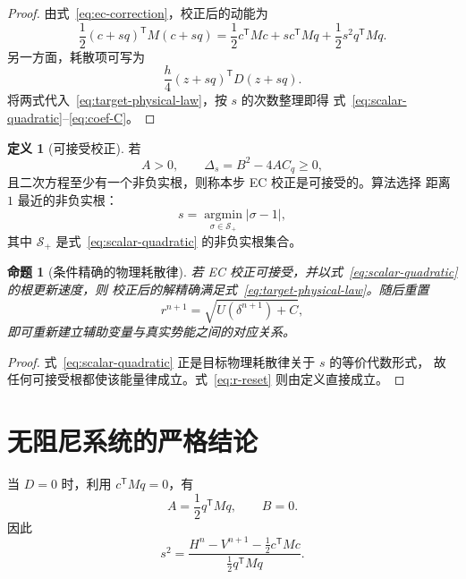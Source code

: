 \documentclass[UTF8,11pt,a4paper]{ctexart}
\newtheorem{proposition}[theorem]{命题}
\theoremstyle{definition}
\newtheorem{definition}[theorem]{定义}
\theoremstyle{remark}
\newcommand{\trans}{\mathsf{T}}
\begin{document}
\begin{proof}
由式~\eqref{eq:ec-correction}，校正后的动能为
\begin{equation}
  \frac12(c+s q)^{\trans}M(c+s q)
  =\frac12c^{\trans}Mc+s c^{\trans}Mq
   +\frac12s^2q^{\trans}Mq.
\end{equation}
另一方面，耗散项可写为
\begin{equation}
  \frac{h}{4}(z+s q)^{\trans}D(z+s q).
\end{equation}
将两式代入~\eqref{eq:target-physical-law}，按 \(s\) 的次数整理即得
式~\eqref{eq:scalar-quadratic}--\eqref{eq:coef-C}。
\end{proof}

\begin{definition}[可接受校正]
若
\begin{equation}
  A>0,
  \qquad
  \Delta_s=B^2-4AC_q\geq 0,
  \label{eq:admissibility}
\end{equation}
且二次方程至少有一个非负实根，则称本步 EC 校正是可接受的。算法选择
距离 \(1\) 最近的非负实根：
\begin{equation}
  s=\underset{\sigma\in\mathcal{S}_+}{\operatorname{argmin}}
  |\sigma-1|,
\end{equation}
其中 \(\mathcal{S}_+\) 是式~\eqref{eq:scalar-quadratic} 的非负实根集合。
\end{definition}

\begin{proposition}[条件精确的物理耗散律]
若 EC 校正可接受，并以式~\eqref{eq:scalar-quadratic} 的根更新速度，则
校正后的解精确满足式~\eqref{eq:target-physical-law}。随后重置
\begin{equation}
  r^{n+1}=\sqrt{U(\delta^{n+1})+C},
  \label{eq:r-reset}
\end{equation}
即可重新建立辅助变量与真实势能之间的对应关系。
\end{proposition}

\begin{proof}
式~\eqref{eq:scalar-quadratic} 正是目标物理耗散律关于 \(s\) 的等价代数形式，
故任何可接受根都使该能量律成立。式~\eqref{eq:r-reset} 则由定义直接成立。
\end{proof}

\section{无阻尼系统的严格结论}

当 \(D=0\) 时，利用 \(c^{\trans}Mq=0\)，有
\begin{equation}
  A=\frac12q^{\trans}Mq,
  \qquad B=0.
\end{equation}
因此
\begin{equation}
  s^2=
  \frac{H^n-V^{n+1}-\frac12c^{\trans}Mc}
       {\frac12q^{\trans}Mq}.
  \label{eq:conservative-scale}
\end{equation}
\end{document}
